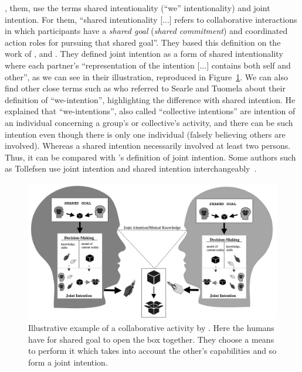 \documentclass[a4paper,11pt,twoside]{StyleThese}
\begin{document}
\cite{tomasello_2005_understanding}, them, use the terms shared intentionality (``we'' intentionality) and joint intention. For them, ``shared intentionality [...] refers to collaborative interactions in which participants have a \emph{shared goal} (\emph{shared commitment}) and coordinated action roles for pursuing that shared goal''. They based this definition on the work of \cite{gilbert_1989_social}, \cite{searle_1983_intentionality} and \cite{tuomela_1995_importance}. They defined joint intention as a form of shared intentionality where each partner's ``representation of the intention [...] contains both self and other'', as we can see in their illustration, reproduced in Figure~\ref{chap1:fig:ji}. We can also find other close terms such as \cite{bratman_1993_shared} who referred to Searle and Tuomela about their definition of ``we-intention'', highlighting the difference with shared intention. He explained that ``we-intentions'', also called ``collective intentions'' are intention of an individual concerning a group's or collective's activity, and there can be such intention even though there is only one individual (falsely believing others are involved). Whereas a shared intention necessarily involved at least two persons. Thus, it can be compared with \citeauthor{tomasello_2005_understanding}'s definition of joint intention. Some authors such as Tollefsen use joint intention and shared intention interchangeably~\citep{tollefsen_2005_let}.

 \begin{figure}[!ht]
 	\includegraphics[width=\linewidth]{figures/chapter1/shared_representation.png}
 	\caption{Illustrative example of a collaborative activity by \cite{tomasello_2005_understanding}. Here the humans have for shared goal to open the box together. They choose a means to perform it which takes into account the other's capabilities and so form a joint	intention.}
 	\label{chap1:fig:ji}
 \end{figure}
\end{document}
